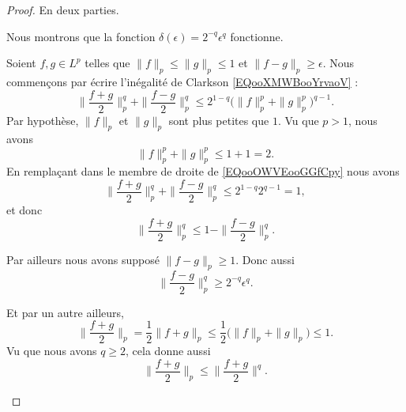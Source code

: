 \begin{proof}
    En deux parties.

    \begin{subproof}
        \spitem[\( 1<p\leq 2\)]
        Nous montrons que la fonction \( \delta(\epsilon)=2^{-q}\epsilon^q\) fonctionne.

        Soient \( f,g\in L^p\) telles que \( \| f \|_p\leq \| g \|_p\leq 1\) et \( \| f-g \|_p\geq \epsilon\). Nous commençons par écrire l'inégalité de Clarkson \eqref{EQooXMWBooYrvaoV} :
        \begin{equation}        \label{EQooOWVEooGGfCpy}
            \| \frac{ f+g }{2} \|_p^q+\| \frac{ f-g }{2} \|_p^q\leq 2^{1-q}\big( \| f \|_p^p+\| g \|_p^p \big)^{q-1}.
        \end{equation}
        Par hypothèse, \( \| f \|_p\) et \( \| g \|_p\) sont plus petites que \( 1\). Vu que \( p>1\), nous avons
        \begin{equation}
            \| f \|_p^p+\| g \|_p^p\leq 1+1=2.
        \end{equation}
        En remplaçant dans le membre de droite de \eqref{EQooOWVEooGGfCpy} nous avons
        \begin{equation}
            \| \frac{ f+g }{2} \|_p^q+\| \frac{ f-g }{2} \|_p^q\leq 2^{1-q}2^{q-1}=1,
        \end{equation}
        et donc
        \begin{equation}        \label{EQooKARVooDrOuJI}
            \| \frac{ f+g }{2} \|_p^q\leq 1-\| \frac{ f-g }{2} \|_p^q.
        \end{equation}

        Par ailleurs nous avons supposé \( \| f-g \|_p\geq 1\). Donc aussi
        \begin{equation}        \label{EQooCGDDooWtDokf}
            \| \frac{ f-g }{2} \|_p^q\geq 2^{-q}\epsilon^q.
        \end{equation}

        Et par un autre ailleurs,
        \begin{equation}        \label{EQooOFWYooLVrNDc}
            \| \frac{ f+g }{2} \|_p=\frac{ 1 }{2}\| f+g \|_p\leq \frac{ 1 }{2}\big( \| f \|_p+\| g \|_p \big)\leq 1.
        \end{equation}
        Vu que nous avons \( q\geq 2\), cela donne aussi
        \begin{equation}        \label{EQooGMPRooGiLSss}
            \| \frac{ f+g }{2} \|_p\leq \| \frac{ f+g }{2} \|^q.
        \end{equation}


\end{subproof}
\end{proof}
